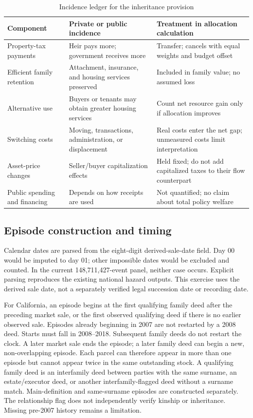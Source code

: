 \begin{table}[!ht]\centering
\caption{Incidence ledger for the inheritance provision}\label{tab:incidence}
{\small\begin{tabular}{p{}p{}p{}}\toprule
Component & Private or public incidence & Treatment in allocation calculation\\\midrule
Property-tax payments & Heir pays more; government receives more & Transfer; cancels with equal weights and budget offset\\
Efficient family retention & Attachment, insurance, and housing services preserved & Included in family value; no assumed loss\\
Alternative use & Buyers or tenants may obtain greater housing services & Count net resource gain only if allocation improves\\
Switching costs & Moving, transactions, administration, or displacement & Real costs enter the net gap; unmeasured costs limit interpretation\\
Asset-price changes & Seller/buyer capitalization effects & Held fixed; do not add capitalized taxes to their flow counterpart\\
Public spending and financing & Depends on how receipts are used & Not quantified; no claim about total policy welfare\\
\bottomrule\end{tabular}}\end{table}

\subsection{Episode construction and timing}

Calendar dates are parsed from the eight-digit derived-sale-date field.
Day 00 would be imputed to day 01; other impossible dates would be excluded
and counted. In the current 148,711,427-event panel, neither case occurs.
Explicit parsing reproduces the existing national hazard outputs. This
exercise uses the derived sale date, not a separately verified legal
succession date or recording date.

For California, an episode begins at the first qualifying family deed
after the preceding market sale, or the first observed qualifying deed if
there is no earlier observed sale. Episodes already beginning in 2007 are
not restarted by a 2008 deed. Starts must fall in 2008--2018. Subsequent
family deeds do not restart the clock. A later market sale ends the episode;
a later family deed can begin a new, non-overlapping episode. Each parcel
can therefore appear in more than one episode but cannot appear twice in
the same outstanding stock. A qualifying family deed is an interfamily deed
between parties with the same surname, an estate/executor deed, or another
interfamily-flagged deed without a surname match. Main-definition and
same-surname episodes are constructed separately. The relationship flag
does not independently verify kinship or inheritance. Missing pre-2007 history
remains a limitation.

